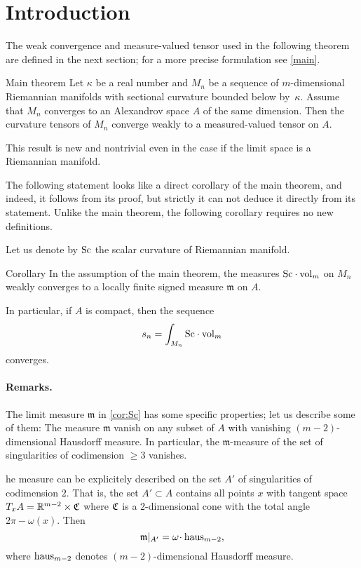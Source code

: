 \section{Introduction}

The weak convergence and measure-valued tensor used in the following theorem are defined in the next section;
for a more precise formulation see \ref{main}.

\begin{thm}{Main theorem}
Let $\kappa$ be a real number and 
$M_n$ be a sequence of $m$-dimensional Riemannian manifolds with sectional curvature bounded below by~$\kappa$.
Assume that $M_n$ converges to an Alexandrov space $A$ of the same dimension.
Then the curvature tensors of $M_n$ converge weakly to a measured-valued tensor on $A$.
\end{thm}

This result is new and nontrivial even in the case if the limit space is a Riemannian manifold.


The following statement looks like a direct corollary of the main theorem, 
and indeed, it follows from its proof, but strictly it can not deduce it directly from its statement.
Unlike the main theorem, the following corollary requires no new definitions.
 
Let us denote by $\operatorname{\rm Sc}$ the scalar curvature of Riemannian manifold.


\begin{thm}{Corollary}\label{cor:Sc}
In the assumption of the main theorem,
the measures $\Sc\cdot \vol_m$ on $M_n$ weakly converges to a locally finite signed measure $\mathfrak m$  on $A$.

In particular, if $A$ is compact, then the sequence
\[s_n=\int_{M_n}\Sc \cdot\vol_m\]
converges.
\end{thm}


\paragraph{Remarks.}
The limit measure $\mathfrak m$ in \ref{cor:Sc} has some specific properties;
let us describe some of them:
The measure $\mathfrak m$ vanish on any subset of $A$ with vanishing $(m-2)$-dimensional Hausdorff measure.
In particular, the $\mathfrak m$-measure of the set of singularities
of codimension $\ge 3$ vanishes.

he measure can be explicitely described 
on the set $A'$ of singularities
of codimension $2$. That is, the set $A'\subset A$
contains all points $x$ with tangent space
$T_xA=\mathbb{R}^{m-2}\times \mathfrak{C}$
where $\mathfrak{C}$ is a $2$-dimensional cone
with the total angle $2\pi-\omega(x)$.
Then 
$$\mathfrak m|_{A'}=\omega\cdot \haus_{m-2},$$
where $\operatorname{\rm haus}_{m-2}$ denotes $(m-2)$-dimensional Hausdorff measure.


